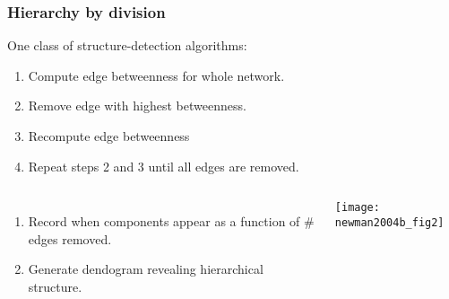\begin{frame}
  \frametitle{Hierarchy by division}

  \begin{block}{One class of structure-detection algorithms:}
    \begin{enumerate}
    \item<1-> 
      Compute edge betweenness for whole network.
    \item<2-> 
      \alert{Remove} edge with highest betweenness.
    \item<3-> 
      Recompute edge betweenness
    \item<4->
      Repeat steps 2 and 3 until all edges are removed.
    \end{enumerate}
    \begin{columns}
      \begin{enumerate}
      \item<5->[5]
        Record when components appear as a function
        of \# edges removed.
      \item<6->[6]
        Generate \alert{dendogram} revealing hierarchical structure.
      \end{enumerate}
      \begin{overprint}
        \texttt{[image: newman2004b\_fig2]}\\
      \end{overprint}
    \end{columns}
  \end{block}



\end{frame}

